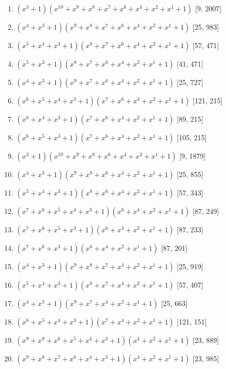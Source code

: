 \documentclass[10pt,twocolumn]{article}
\begin{document}
\begin{enumerate}
\item $(x^{3} + 1)(x^{10} + x^{9} + x^{8} + x^{7} + x^{6} + x^{4} + x^{2} + x^{1} + 1)$  [9, 2007]
\item $(x^{4} + x^{3} + 1)(x^{9} + x^{8} + x^{7} + x^{6} + x^{4} + x^{2} + x^{1} + 1)$  [25, 983]
\item $(x^{5} + x^{4} + x^{3} + 1)(x^{8} + x^{7} + x^{6} + x^{4} + x^{2} + x^{1} + 1)$  [57, 471]
\item $(x^{5} + x^{3} + 1)(x^{8} + x^{7} + x^{6} + x^{4} + x^{2} + x^{1} + 1)$  [41, 471]
\item $(x^{4} + x^{3} + 1)(x^{9} + x^{7} + x^{6} + x^{4} + x^{2} + x^{1} + 1)$  [25, 727]
\item $(x^{6} + x^{5} + x^{4} + x^{3} + 1)(x^{7} + x^{6} + x^{4} + x^{2} + x^{1} + 1)$  [121, 215]
\item $(x^{6} + x^{4} + x^{3} + 1)(x^{7} + x^{6} + x^{4} + x^{2} + x^{1} + 1)$  [89, 215]
\item $(x^{6} + x^{5} + x^{3} + 1)(x^{7} + x^{6} + x^{4} + x^{2} + x^{1} + 1)$  [105, 215]
\item $(x^{3} + 1)(x^{10} + x^{9} + x^{8} + x^{6} + x^{4} + x^{2} + x^{1} + 1)$  [9, 1879]
\item $(x^{4} + x^{3} + 1)(x^{9} + x^{8} + x^{6} + x^{4} + x^{2} + x^{1} + 1)$  [25, 855]
\item $(x^{5} + x^{4} + x^{3} + 1)(x^{8} + x^{6} + x^{4} + x^{2} + x^{1} + 1)$  [57, 343]
\item $(x^{7} + x^{6} + x^{5} + x^{4} + x^{3} + 1)(x^{6} + x^{4} + x^{2} + x^{1} + 1)$  [87, 249]
\item $(x^{7} + x^{6} + x^{5} + x^{3} + 1)(x^{6} + x^{4} + x^{2} + x^{1} + 1)$  [87, 233]
\item $(x^{7} + x^{6} + x^{3} + 1)(x^{6} + x^{4} + x^{2} + x^{1} + 1)$  [87, 201]
\item $(x^{4} + x^{3} + 1)(x^{9} + x^{8} + x^{7} + x^{4} + x^{2} + x^{1} + 1)$  [25, 919]
\item $(x^{5} + x^{4} + x^{3} + 1)(x^{8} + x^{7} + x^{4} + x^{2} + x^{1} + 1)$  [57, 407]
\item $(x^{4} + x^{3} + 1)(x^{9} + x^{7} + x^{4} + x^{2} + x^{1} + 1)$  [25, 663]
\item $(x^{6} + x^{5} + x^{4} + x^{3} + 1)(x^{7} + x^{4} + x^{2} + x^{1} + 1)$  [121, 151]
\item $(x^{9} + x^{8} + x^{6} + x^{5} + x^{4} + x^{3} + 1)(x^{4} + x^{2} + x^{1} + 1)$  [23, 889]
\item $(x^{9} + x^{8} + x^{7} + x^{6} + x^{4} + x^{3} + 1)(x^{4} + x^{2} + x^{1} + 1)$  [23, 985]

\end{enumerate}
\end{document}
